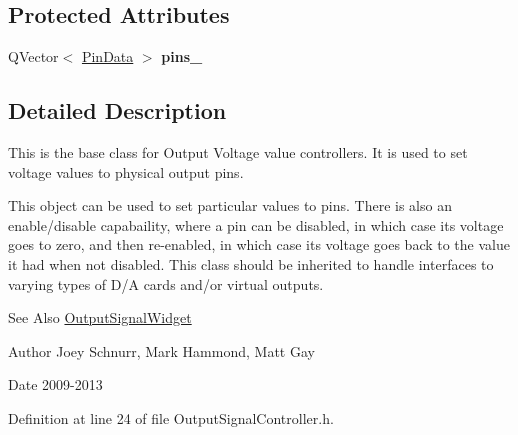 \subsection*{Protected Attributes}
\begin{DoxyCompactItemize}
\item 
\hypertarget{class_picto_1_1_output_signal_controller_ae118864ba14ce47ab1e2575517604489}{Q\-Vector$<$ \hyperlink{struct_picto_1_1_output_signal_controller_1_1_pin_data}{Pin\-Data} $>$ {\bfseries pins\-\_\-}}\label{class_picto_1_1_output_signal_controller_ae118864ba14ce47ab1e2575517604489}

\end{DoxyCompactItemize}


\subsection{Detailed Description}
This is the base class for Output Voltage value controllers. It is used to set voltage values to physical output pins. 

This object can be used to set particular values to pins. There is also an enable/disable capabaility, where a pin can be disabled, in which case its voltage goes to zero, and then re-\/enabled, in which case its voltage goes back to the value it had when not disabled. This class should be inherited to handle interfaces to varying types of D/\-A cards and/or virtual outputs. \begin{DoxySeeAlso}{See Also}
\hyperlink{class_picto_1_1_output_signal_widget}{Output\-Signal\-Widget} 
\end{DoxySeeAlso}
\begin{DoxyAuthor}{Author}
Joey Schnurr, Mark Hammond, Matt Gay 
\end{DoxyAuthor}
\begin{DoxyDate}{Date}
2009-\/2013 
\end{DoxyDate}


Definition at line 24 of file Output\-Signal\-Controller.\-h.



